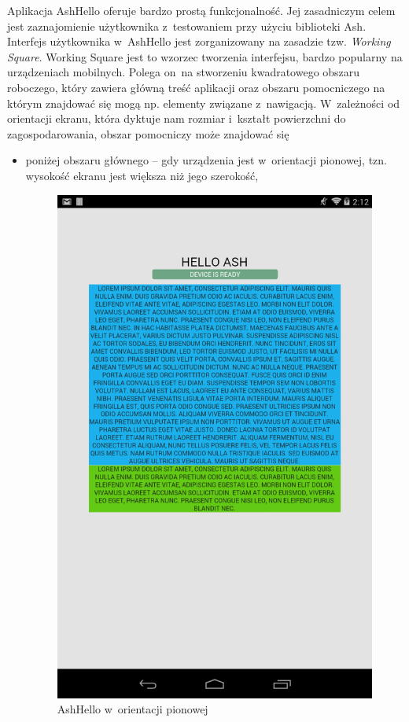 \documentclass{xmgr}
\begin{document}
Aplikacja AshHello oferuje bardzo prostą funkcjonalność. Jej zasadniczym celem jest zaznajomienie użytkownika z~testowaniem przy użyciu biblioteki Ash. Interfejs użytkownika w~AshHello jest zorganizowany na zasadzie tzw. {\it Working Square}. Working Square jest to wzorzec tworzenia interfejsu, bardzo popularny na urządzeniach mobilnych. Polega on~na stworzeniu kwadratowego obszaru roboczego, który zawiera główną treść aplikacji oraz obszaru pomocniczego na którym znajdować się mogą np. elementy związane z~nawigacją. W~zależności od orientacji ekranu, która dyktuje nam rozmiar i~kształt powierzchni do zagospodarowania, obszar pomocniczy może znajdować się 

\begin{itemize}
  \item poniżej obszaru głównego -- gdy urządzenia jest w~orientacji pionowej, tzn. wysokość ekranu jest większa niż jego szerokość,

\begin{figure}[h]
    \centering
    \includegraphics[scale=0.25]{hello1.png}
    \caption{AshHello w~orientacji pionowej}
    \label{fig:AshHello1}
\end{figure}


\end{itemize}
\end{document}
